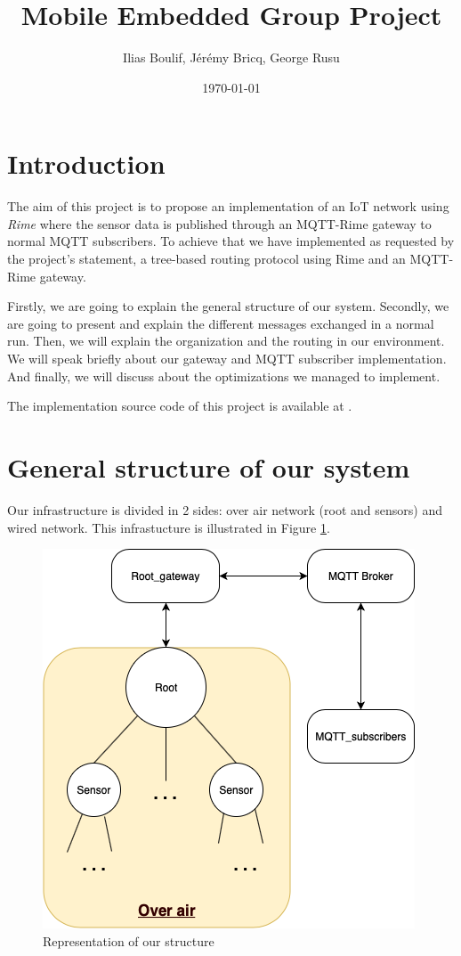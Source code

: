 \documentclass[a4paper,10pt]{article}
\title{Mobile Embedded Group Project}
\author{Ilias Boulif, Jérémy Bricq, George Rusu}
\date{\today}
\begin{document}
\maketitle
\tableofcontents
\newpage
\section{Introduction}

The aim of this project is to propose an implementation of an IoT network using \textit{Rime} where the sensor data is published through an MQTT-Rime gateway to normal MQTT subscribers. To achieve that we have implemented as requested by the project's statement, a tree-based routing protocol using Rime and an MQTT-Rime gateway.

Firstly, we are going to explain the general structure of our system. Secondly, we are going to present and explain the different messages exchanged in a normal run. Then, we will explain the organization and the routing in our environment. We will speak briefly about our gateway and MQTT subscriber implementation. And finally, we will discuss about the optimizations we managed to implement.

The implementation source code of this project is available at \cite{github}.


\section{General structure of our system}
Our infrastructure is divided in 2 sides: over air network (root and sensors) and wired network. This infrastucture is illustrated in Figure \ref{fig:fig1}.

\begin{figure}[!htb]
\centering
\includegraphics[scale=0.5]{./img/structure.png}
\caption{Representation of our structure}
\label{fig:fig1}
\end{figure}
\end{document}

